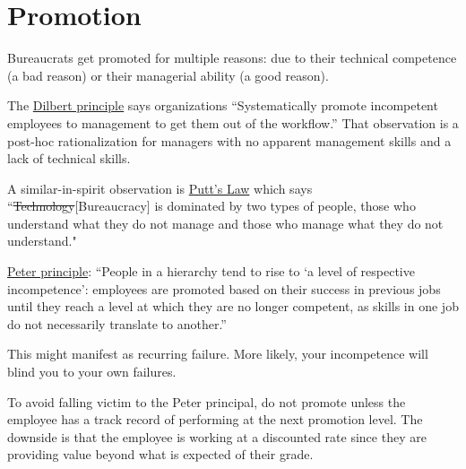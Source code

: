 \section{Promotion\label{sec:promotion}}

Bureaucrats get promoted for multiple reasons: due to their technical competence (a bad reason) or their managerial ability (a good reason).  

The 
\href{https://en.wikipedia.org/wiki/Dilbert_principle}{Dilbert principle}
says organizations
``Systematically promote incompetent employees to management to get them out of the workflow.''
That observation is a post-hoc rationalization for managers with no apparent management skills and a lack of technical skills. 

A similar-in-spirit observation is 
\href{https://en.wikipedia.org/wiki/Putt\%27s_Law_and_the_Successful_Technocrat}{Putt's Law}
which says
``\sout{Technology}[Bureaucracy] is dominated by two types of people, those who understand what they do not manage and those who manage what they do not understand."


\href{https://en.wikipedia.org/wiki/Peter_principle}{Peter principle}:
``People in a hierarchy tend to rise to `a level of respective incompetence': employees are promoted based on their success in previous jobs until they reach a level at which they are no longer competent, as skills in one job do not necessarily translate to another.''

This might manifest as recurring failure. More likely, your incompetence will blind you to your own failures.

To avoid falling victim to the Peter principal, do not promote unless the employee has a track record of performing at the next promotion level. The downside is that the employee is working at a discounted rate since they are providing value beyond what is expected of their grade.


